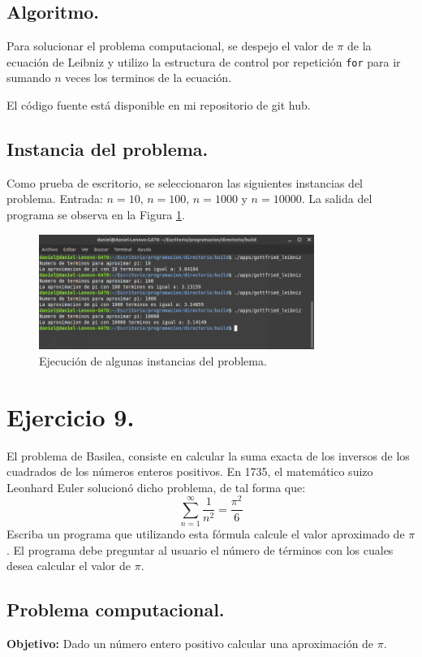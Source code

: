 \documentclass[12pt,letterpaper]{article}
\begin{document}
\subsection{Algoritmo.}
Para solucionar el problema computacional, se despejo el valor de $\pi$ de la ecuaci\'on de Leibniz y utilizo la estructura de control por repetici\'on \texttt{for} para ir sumando $n$ veces los terminos de la ecuaci\'on.

El código fuente está disponible en mi repositorio de git hub. \cite{url:gottried_leibniz}

\subsection{Instancia del problema.}
Como prueba de escritorio, se seleccionaron las siguientes instancias del problema. Entrada: $n=10$, $n=100$, $n=1000$ y $n=10000$. La salida del programa se observa en la Figura \ref{fig:gottried_leibniz}.
\begin{figure}[ht!]
  \centering
  \includegraphics[width=0.8\textwidth]{figures/gottfried_leibniz}
  \caption{Ejecución de algunas instancias del problema.}
  \label{fig:gottried_leibniz}
\end{figure}


\section{Ejercicio 9.}

El problema de Basilea, consiste en calcular la suma exacta de los inversos de los cuadrados de los n\'umeros enteros positivos. En 1735, el matem\'atico suizo Leonhard Euler solucion\'o dicho problema, de tal forma que:
$$ \sum_{n=1}^{\infty}\frac{1}{n^2} = \frac{\pi^2}{6} $$
Escriba un programa que utilizando esta f\'ormula calcule el valor
aproximado de $\pi$. El programa debe preguntar al usuario el n\'umero de t\'erminos con los cuales desea calcular el valor de $\pi$.

\subsection{Problema computacional.}
\textbf{Objetivo:} Dado un n\'umero entero positivo calcular una aproximaci\'on de $\pi$.
\end{document}
